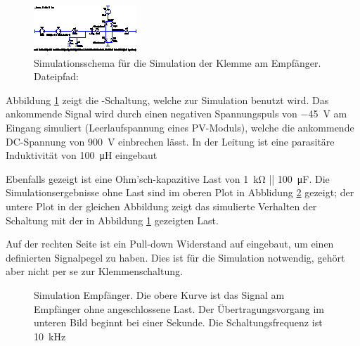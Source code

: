 \begin{figure}[h!tb]
    \centering
    \includegraphics[width=\textwidth]{images/ltspice/jac/shortcircuit-recv.eps}
    \caption[-Schema f\"ur Klemmenschaltung]{
        Simulationsschema f\"ur die Simulation  der Klemme am Empf\"anger.\protect\\
        Dateipfad: %
    }
    \label{fig:ltspice:shortCircuit:receiver}
\end{figure}

Abbildung \ref{fig:ltspice:shortCircuit:receiver} zeigt die -Schaltung,
welche zur Simulation benutzt wird.
Das ankommende  Signal  wird  durch   einen  negativen  Spannungspuls  von
\SI{-45}{\volt}   am   Eingang   simuliert   (Leerlaufspannung   eines
PV-Moduls),  welche  die  ankommende DC-Spannung  von  \SI{900}{\volt}
einbrechen   l\"asst. In der Leitung ist eine parasit\"are Induktivit\"at
von \SI{100}{\micro\henry} eingebaut

Ebenfalls gezeigt  ist eine  Ohm'sch-kapazitive Last von  \SI{1}{\kilo\ohm} ||
\SI{100}{\micro\farad}. Die  Simulationsergebnisse ohne  Last  sind im  oberen
Plot in  Abblidung \ref{fig:simu:short:recv} gezeigt;  der untere Plot  in der
gleichen Abbildung  zeigt das  simulierte Verhalten der  Schaltung mit  der in
Abbildung \ref{fig:ltspice:shortCircuit:receiver} gezeigten Last.

Auf  der  rechten  Seite  ist   ein  Pull-down  Widerstand  auf  
eingebaut,  um einen  definierten  Signalpegel zu  haben. Dies  ist f\"ur  die
Simulation notwendig, geh\"ort aber nicht per se zur Klemmenschaltung.

\clearpage
\begin{figure}[h!tb]
    \centering
    
    \caption[Simulationsergebnisse Klemmenschaltung]{%
        Simulation   Empf\"anger. Die   obere   Kurve  ist   das   Signal   am
        Empf\"anger  ohne  angeschlossene Last. Der  \"Ubertragungsvorgang  im
        unteren  Bild beginnt  bei einer  Sekunde. Die Schaltungsfrequenz  ist
        \SI{10}{\kilo\hertz}%
    }
    \label{fig:simu:short:recv}
\end{figure}

